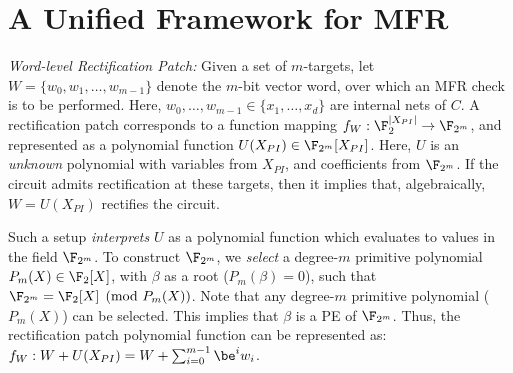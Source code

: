 \section{A Unified Framework for MFR}\label{sec:comps}


{\it Word-level Rectification Patch:} 
Given a set of $m$-targets, let $W = \{w_0,w_1,\dots,w_{m-1}\}$ denote the $m$-bit vector word,
over which an MFR check is to be performed. 
Here, $w_0,\dots,w_{m-1}\in \{x_1,\dots,x_d\}$
are internal nets of $C$. A rectification patch corresponds to 
a function mapping $f_W: \F_2^{|X_{PI}|}\rightarrow\F_{2^m}$, and
represented as a polynomial function $U(X_{PI}) \in
\F_{2^m}[X_{PI}]$. Here, $U$ is an {\it unknown} polynomial
with variables from $X_{PI}$, and coefficients from $\F_{2^m}$. If the circuit admits rectification at these targets, then it implies that, algebraically, $W = U(X_{PI})$ rectifies the circuit. 

Such a setup {\it interprets} $U$ as a polynomial function which
evaluates to values in the field $\F_{2^m}$. To construct $\F_{2^m}$,
we {\it select} a degree-$m$ primitive polynomial $P_m(X)\in\F_2[X]$, with
$\beta$ as a root ($P_m(\beta)=0$), such that 
$\F_{2^m} = \F_2[X] \pmod{ P_m(X)}$. Note that any degree-$m$
primitive polynomial ($P_m(X)$) can be selected. This implies that
$\beta$ is a PE of $\F_{2^m}$. Thus, the rectification patch polynomial
function can be represented as: $f_W: W + U(X_{PI}) = W +
\sum_{i=0}^{m-1}\be^iw_i$.  


